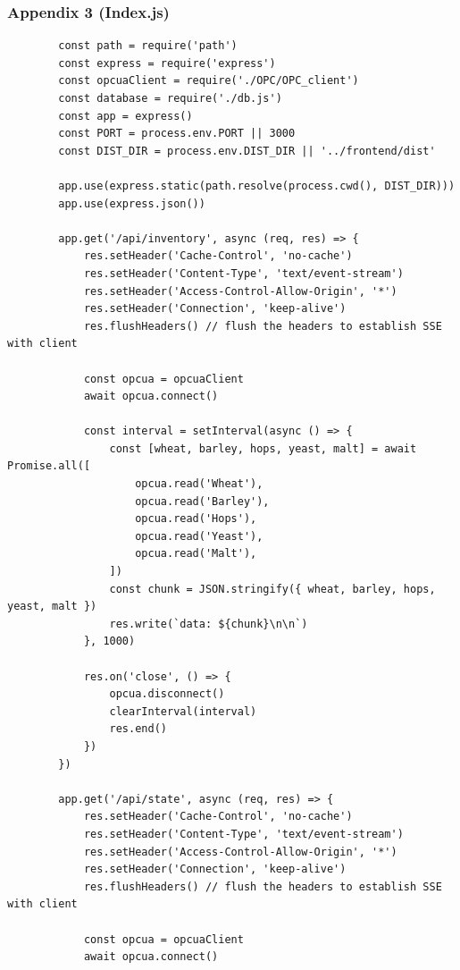 \subsubsection{Appendix 3 (Index.js)}
\begin{center}
    \begin{verbatim}
        const path = require('path')
        const express = require('express')
        const opcuaClient = require('./OPC/OPC_client')
        const database = require('./db.js')
        const app = express()
        const PORT = process.env.PORT || 3000
        const DIST_DIR = process.env.DIST_DIR || '../frontend/dist'

        app.use(express.static(path.resolve(process.cwd(), DIST_DIR)))
        app.use(express.json())

        app.get('/api/inventory', async (req, res) => {
            res.setHeader('Cache-Control', 'no-cache')
            res.setHeader('Content-Type', 'text/event-stream')
            res.setHeader('Access-Control-Allow-Origin', '*')
            res.setHeader('Connection', 'keep-alive')
            res.flushHeaders() // flush the headers to establish SSE with client

            const opcua = opcuaClient
            await opcua.connect()

            const interval = setInterval(async () => {
                const [wheat, barley, hops, yeast, malt] = await Promise.all([
                    opcua.read('Wheat'),
                    opcua.read('Barley'),
                    opcua.read('Hops'),
                    opcua.read('Yeast'),
                    opcua.read('Malt'),
                ])
                const chunk = JSON.stringify({ wheat, barley, hops, yeast, malt })
                res.write(`data: ${chunk}\n\n`)
            }, 1000)

            res.on('close', () => {
                opcua.disconnect()
                clearInterval(interval)
                res.end()
            })
        })

        app.get('/api/state', async (req, res) => {
            res.setHeader('Cache-Control', 'no-cache')
            res.setHeader('Content-Type', 'text/event-stream')
            res.setHeader('Access-Control-Allow-Origin', '*')
            res.setHeader('Connection', 'keep-alive')
            res.flushHeaders() // flush the headers to establish SSE with client

            const opcua = opcuaClient
            await opcua.connect()


\end{verbatim}
\end{center}
